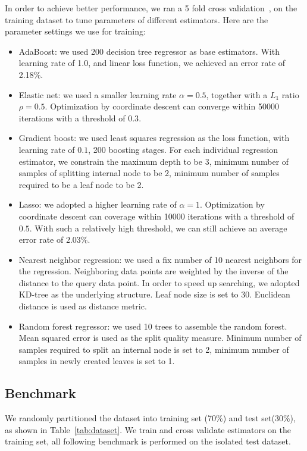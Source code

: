 In order to achieve better performance, we ran a 5 fold cross
validation~\cite{murphy2012machine}, on the
training dataset to tune parameters of different estimators. Here are the
parameter settings we use for training:
\begin{itemize}
   \item AdaBoost: we used 200 decision tree regressor as base estimators. With
      learning rate of 1.0, and linear loss function, we achieved an error rate
      of 2.18\%.
   \item Elastic net: we used a smaller learning rate $\alpha=0.5$, together
      with a $L_1$ ratio $\rho=0.5$. Optimization by coordinate descent can
      converge within 50000 iterations with a threshold of $0.3$.
   \item Gradient boost: we used least squares regression as the loss function,
      with learning rate of $0.1$, 200 boosting stages. For each individual
      regression estimator, we constrain the maximum depth to be 3, minimum
      number of samples of splitting internal node to be 2, minimum number of
      samples required to be a leaf node to be 2.
   \item Lasso: we adopted a higher learning rate of $\alpha=1$. Optimization
      by coordinate descent can coverage within 10000 iterations with a
      threshold of $0.5$. With such a relatively high threshold, we can still
      achieve an average error rate of $2.03\%$.
   \item Nearest neighbor regression: we used a fix number of 10 nearest
      neighbors for the regression. Neighboring data points are weighted by
      the inverse of the distance to the query data point. In order to speed up
      searching, we adopted KD-tree as the underlying structure. Leaf node size
      is set to 30. Euclidean distance is used as distance metric.
   \item Random forest regressor: we used 10 trees to assemble the random
      forest. Mean squared error is used as the split quality measure. Minimum
      number of samples required to split an internal node is set to 2, minimum
      number of samples in newly created leaves is set to 1.
\end{itemize}

\subsection{Benchmark}
\label{sub:benchmark}

We randomly partitioned the dataset into training set (70\%) and test
set(30\%), as shown in Table~\ref{tab:dataset}. We train and cross validate
estimators on the training set, all following benchmark is performed on the
isolated test dataset.

